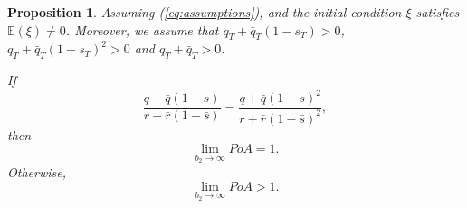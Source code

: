 \documentclass[11pt]{article}
\newtheorem{remark}{Remark}
\newtheorem{proposition}{Proposition}
\begin{document}
\begin{proposition}
	Assuming (\ref{eq:assumptions}), and the initial condition $\xi$ satisfies $\mathbb{E}(\xi)\neq 0$. Moreover, we assume that $q_T+\bar{q}_T(1-s_T)>0$, $q_T+\bar{q}_T(1-s_T)^2>0$ and $q_T + \bar{q}_T > 0$.
	
	If 
	\begin{equation*}
	\frac{q+\bar{q}(1-s)}{r+\bar{r}(1-\bar{s})} =\frac{q+\bar{q}(1-s)^2}{r+\bar{r}(1-\bar{s})^2},
	\end{equation*}
	then 
	$$ \lim_{b_2 \to \infty} PoA = 1.$$	
	Otherwise, 
	$$ \lim_{b_2 \to \infty} PoA >1.$$
\label{prop:b2_to_infty}
\end{proposition}


\end{document}
